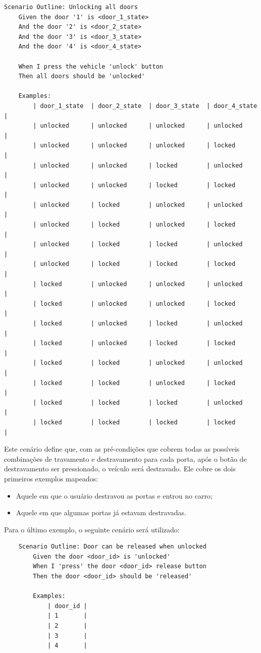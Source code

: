\begin{verbatim}
Scenario Outline: Unlocking all doors    
    Given the door '1' is <door_1_state>
    And the door '2' is <door_2_state>
    And the door '3' is <door_3_state>
    And the door '4' is <door_4_state>

    When I press the vehicle 'unlock' button
    Then all doors should be 'unlocked'

    Examples:
        | door_1_state  | door_2_state  | door_3_state  | door_4_state  |
        | unlocked      | unlocked      | unlocked      | unlocked      |
        | unlocked      | unlocked      | unlocked      | locked        |
        | unlocked      | unlocked      | locked        | unlocked      |
        | unlocked      | unlocked      | locked        | locked        |
        | unlocked      | locked        | unlocked      | unlocked      |
        | unlocked      | locked        | unlocked      | locked        |
        | unlocked      | locked        | locked        | unlocked      |
        | unlocked      | locked        | locked        | locked        |
        | locked        | unlocked      | unlocked      | unlocked      |
        | locked        | unlocked      | unlocked      | locked        |
        | locked        | unlocked      | locked        | unlocked      |
        | locked        | unlocked      | locked        | locked        |
        | locked        | locked        | unlocked      | unlocked      |
        | locked        | locked        | unlocked      | locked        |
        | locked        | locked        | locked        | unlocked      |
        | locked        | locked        | locked        | locked        |
\end{verbatim}

Este cenário define que, com as pré-condições que cobrem todas as possíveis combinações de travamento e destravamento para cada porta, após o botão de destravamento 
ser pressionado, o veículo será destravado. Ele cobre os dois primeiros exemplos mapeados:
\begin{itemize}
    \item Aquele em que o usuário destravou as portas e entrou no carro;
    \item Aquele em que algumas portas já estavam destravadas.
\end{itemize}

Para o último exemplo, o seguinte cenário será utilizado:

\begin{verbatim}
    Scenario Outline: Door can be released when unlocked
        Given the door <door_id> is 'unlocked'
        When I 'press' the door <door_id> release button
        Then the door <door_id> should be 'released'

        Examples:
            | door_id |
            | 1       |
            | 2       |
            | 3       |
            | 4       |
\end{verbatim}

